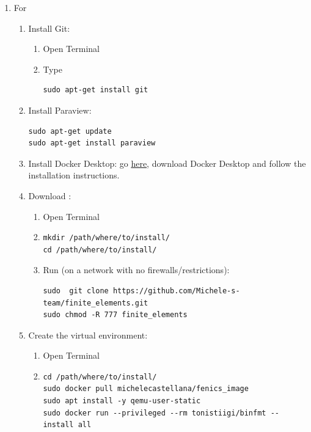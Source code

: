 \documentclass{article}
\begin{document}
\begin{enumerate}
      \item For \linux
            \begin{enumerate}
                  \item Install Git:
                        \begin{enumerate}
                              \item Open Terminal
                              \item Type
                                    \begin{verbatim}
sudo apt-get install git 
                                    \end{verbatim}
                        \end{enumerate}
                  \item Install Paraview:
                        \begin{verbatim}
sudo apt-get update 
sudo apt-get install paraview
            \end{verbatim}
                  \item Install Docker Desktop: go  \href{https://www.docker.com/products/docker-desktop/}{here}, download Docker Desktop and follow the installation instructions.
                  \item Download \libname{}:
                        \begin{enumerate}
                              \item Open Terminal
                              \item
                                    \begin{verbatim}
mkdir /path/where/to/install/
cd /path/where/to/install/
                              \end{verbatim}
                              \item Run (on a network with no firewalls/restrictions):
                                    \begin{verbatim}
sudo  git clone https://github.com/Michele-s-team/finite_elements.git
sudo chmod -R 777 finite_elements
                                    \end{verbatim}
                        \end{enumerate}
                  \item Create the virtual environment:
                        \begin{enumerate}
                              \item Open Terminal
                              \item \begin{verbatim}
cd /path/where/to/install/
sudo docker pull michelecastellana/fenics_image
sudo apt install -y qemu-user-static
sudo docker run --privileged --rm tonistiigi/binfmt --install all                        
                  \end{verbatim}


\end{enumerate}
\end{enumerate}
\end{enumerate}
\end{document}
